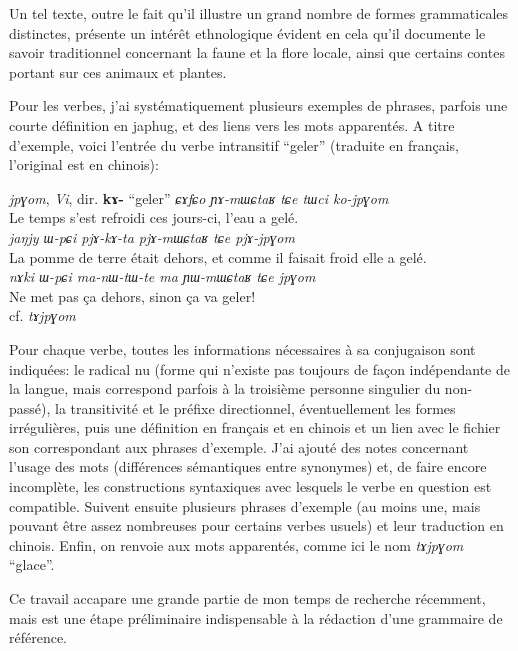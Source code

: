 \documentclass[oldfontcommands,oneside,a4paper,11pt]{memoir}
\begin{document}
Un tel texte, outre le fait qu'il illustre un grand nombre de formes grammaticales distinctes, présente un intérêt ethnologique évident en cela qu'il documente le savoir traditionnel concernant la faune et la flore locale, ainsi que certains contes  portant sur ces animaux et plantes. 

Pour les verbes, j'ai systématiquement plusieurs exemples de phrases, parfois une courte définition en japhug, et des liens vers les mots apparentés. A titre d'exemple, voici l'entrée du verbe intransitif ``geler'' (traduite en français, l'original est en chinois):

\begin{exe}
\ex \textit{jpɣom},	\textit{Vi}, dir. \textbf{kɤ-} ``geler''  
\glt \textit{ɕɤfɕo ɲɤ-mɯɕtaʁ tɕe tɯci ko-jpɣom} \\
   Le temps s'est refroidi ces jours-ci, l'eau a gelé. \\
\glt  \textit{jaŋjy ɯ-pɕi pjɤ-kɤ-ta pjɤ-mɯɕtaʁ tɕe pjɤ-jpɣom} \\
  La pomme de terre était dehors, et comme il faisait froid elle a gelé. \\
\glt  \textit{nɤki ɯ-pɕi ma-nɯ-tɯ-te ma ɲɯ-mɯɕtaʁ tɕe jpɣom} \\
  Ne met pas ça dehors, sinon ça va geler! \\
  
  \glt cf. \textit{tɤjpɣom}
\end{exe}
Pour chaque verbe, toutes les informations nécessaires à sa conjugaison sont indiquées: le radical nu (forme qui n'existe pas toujours de façon indépendante de la langue, mais correspond parfois à la troisième personne singulier du non-passé), la transitivité et le préfixe directionnel, éventuellement les formes irrégulières, puis une définition en français et en chinois et un lien avec le fichier son correspondant aux phrases d'exemple. J'ai ajouté des notes concernant l'usage des mots (différences sémantiques entre synonymes) et, de faire encore incomplète, les constructions syntaxiques avec lesquels le verbe en question est compatible. Suivent ensuite plusieurs phrases d'exemple (au moins une, mais pouvant être assez nombreuses pour certains verbes usuels) et leur traduction en chinois. Enfin, on renvoie aux mots apparentés, comme ici le nom \textit{tɤjpɣom} ``glace''.


	
	Ce travail accapare une grande partie de mon temps de recherche récemment, mais est une étape préliminaire indispensable à la rédaction d'une grammaire de référence. 
	
\end{document}
